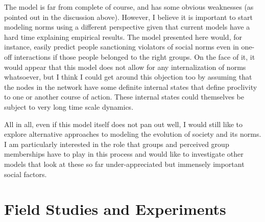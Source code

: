\documentclass[rutwik_proposal.tex]{subfiles}
\begin{document}
The model is far from complete of course, and has some obvious weaknesses (as pointed out in the discussion above). However, I believe it is important to start modeling norms using a different perspective given that current models have a hard time explaining empirical results. The model presented here would, for instance, easily predict people sanctioning violators of social norms even in one-off interactions if those people belonged to the right groups. On the face of it, it would appear that this model does not allow for any internalization of norms whatsoever, but I think I could get around this objection too by assuming that the nodes in the network have some definite internal states that define proclivity to one or another course of action. These internal states could themselves be subject to very long time scale dynamics.

All in all, even if this model itself does not pan out well, I would still like to explore alternative approaches to modeling the evolution of society and its norms. I am particularly interested in the role that groups and perceived group memberships have to play in this process and would like to investigate other models that look at these so far under-appreciated but immensely important social factors.

\chapter{Field Studies and Experiments}\label{ch:field}
\end{document}
